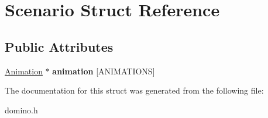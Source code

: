 \hypertarget{struct_scenario}{}\section{Scenario Struct Reference}
\label{struct_scenario}
\subsection*{Public Attributes}
\begin{DoxyCompactItemize}
\item 
\hypertarget{struct_scenario_a544426718871801ac250e9e88fe1be21}{}\hyperlink{struct_animation}{Animation} $\ast$ {\bfseries animation} \mbox{[}A\+N\+I\+M\+A\+T\+I\+O\+N\+S\mbox{]}\label{struct_scenario_a544426718871801ac250e9e88fe1be21}

\end{DoxyCompactItemize}


The documentation for this struct was generated from the following file\+:\begin{DoxyCompactItemize}
\item 
domino.\+h\end{DoxyCompactItemize}
